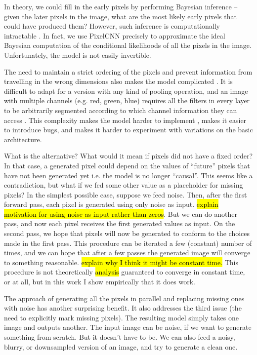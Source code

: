 \documentclass[10pt,a4paper]{article}
\newcommand{\nquote}[1]{``{#1}''}
\begin{document}
In theory, we could fill in the early pixels by performing Bayesian inference \cite{??} -- given the later pixels in the image, what are the most likely early pixels that could have produced them? However, such inference is computationally intractable \cite{??}. In fact, we use PixelCNN precisely to approximate the ideal Bayesian computation of the conditional likelihoods of all the pixels in the image. Unfortunately, the model is not easily invertible.

The need to maintain a strict ordering of the pixels and prevent information from travelling in the wrong dimensions also makes the model complicated \cite{??}. It is difficult to adapt for a version with any kind of pooling operation, and an image with multiple channels (e.g. red, green, blue) requires all the filters in every layer to be arbitrarily segmented according to which channel information they can access \cite{??}. This complexity makes the model harder to implement \cite{??}, makes it easier to introduce bugs, and makes it harder to experiment with variations on the basic architecture.

What is the alternative? What would it mean if pixels did not have a fixed order? In that case, a generated pixel could depend on the values of \nquote{future} pixels that have not been generated yet i.e. the model is no longer \nquote{causal}. This seems like a contradiction, but what if we fed some other value as a placeholder for missing pixels? In the simplest possible case, suppose we feed noise. Then, after the first forward pass, each pixel is generated using only noise as input. \hl{explain motivation for using noise as input rather than zeros}. But we can do another pass, and now each pixel receives the first generated values as input. On the second pass, we hope that pixels will now be generated to conform to the choices made in the first pass. This procedure can be iterated a few (constant) number of times, and we can hope that after a few passes the generated image will converge to something reasonable. \hl{explain why I think it might be constant time.} This procedure is not theoretically \hl{analysis} guaranteed to converge in constant time, or at all, but in this work I show empirically that it does work.

The approach of generating all the pixels in parallel and replacing missing ones with noise has another surprising benefit. It also addresses the third issue (the need to explicitly mark missing pixels). The resulting model simply takes one image and outputs another. The input image can be noise, if we want to generate something from scratch. But it doesn't have to be. We can also feed a noisy, blurry, or downsampled version of an image, and try to generate a clean one.
\end{document}
